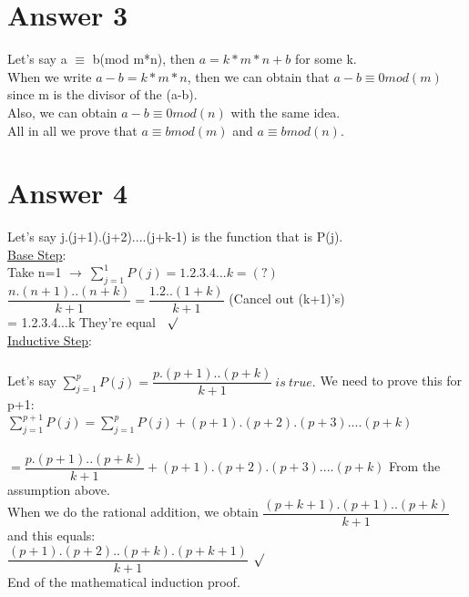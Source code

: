\documentclass[12pt]{article}
\begin{document}
\section*{Answer 3}
Let's say a $\equiv$ b(mod m*n), then $a=k*m*n+b$ for some k.\\
When we write $a-b=k*m*n$, then we can obtain that $a-b \equiv 0mod(m)$ since m is the divisor of the (a-b).\\
Also, we can obtain  $a-b \equiv 0mod(n)$ with the same idea.\\
All in all we prove that  $a \equiv bmod(m)$ and $a \equiv bmod(n)$. 


\section*{Answer 4}
Let's say j.(j+1).(j+2)....(j+k-1) is the function that is P(j).\\ 
\underline{Base Step}:\\
Take n=1 $\rightarrow \ \sum_{j=1}^{1} P(j) = 1.2.3.4...k =(?)$\\
$\dfrac{n.(n+1)..(n+k)}{k+1} = \dfrac{1.2..(1+k)}{k+1} $ (Cancel out (k+1)'s)\\
=  1.2.3.4...k    They're equal \ $\surd$\\
\underline{Inductive Step}:\\ \\
Let's say $\sum_{j=1}^{p} P(j) = \dfrac{p.(p+1)..(p+k)}{k+1} \ is \ true. $
We need to prove this for p+1:\\
$\sum_{j=1}^{p+1} P(j) = \sum_{j=1}^{p} P(j) + (p+1).(p+2).(p+3)....(p+k)$\\ \\
 $= \dfrac{p.(p+1)..(p+k)}{k+1} + (p+1).(p+2).(p+3)....(p+k) $ From the assumption above.\\
 When we do the rational addition, we obtain $\dfrac{(p+k+1).(p+1)..(p+k)}{k+1}$ and this equals:\\
 $\dfrac{(p+1).(p+2)..(p+k).(p+k+1)}{k+1}$ $\surd$ \\ End of the mathematical induction proof.
 
\end{document}
